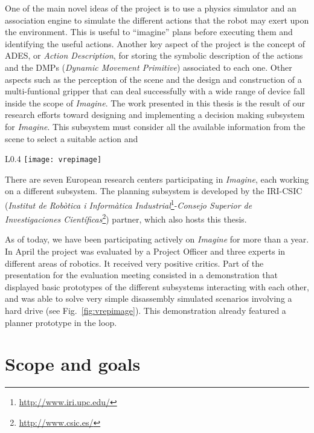\documentclass[../root.tex]{subfiles}
\begin{document}
One of the main novel ideas of the project is to use a physics simulator and an
association engine
to simulate the different actions that the robot may exert upon the environment.
This is useful to ``imagine'' plans before executing them and identifying
the useful actions. Another key aspect of the project is the concept
of ADES, or \emph{Action Description}, for storing the symbolic description
of the actions and the DMPs (\emph{Dynamic Movement Primitive}) associated to
each one. Other aspects such as the perception of the scene and the
design and construction of a multi-funtional gripper that can deal
successfully with a wide range of device fall inside the scope of \emph{Imagine}.
The work presented in this thesis is the result of our research efforts toward
designing and implementing a decision making subsystem for \emph{Imagine}. This
subsystem must consider all the available information from the scene to select
a suitable action and 

\begin{wrapfigure}{L}{0.4\columnwidth}
	\centering
	\texttt{[image: vrepimage]}
	\caption{Execution of a levering action in the V-REP simulator.}
	\label{fig:vrepimage}
\end{wrapfigure}

There are seven European research centers participating in \emph{Imagine},
each working on a different subsystem.
The planning subsystem is developed by the IRI-CSIC 
(\emph{Institut de Rob\`otica i Inform\`atica
Industrial}\footnote{\url{http://www.iri.upc.edu/}}-\emph{Consejo Superior
de Investigaciones
Cient\'ificas}\footnote{\url{http://www.csic.es/}}) partner, which also hosts
this thesis.

As of today, we have been participating actively on \emph{Imagine} for more
than a year.
In April the project was evaluated by a Project Officer and three experts in
different areas of robotics. It received very positive critics. Part of the
presentation for the evaluation meeting consisted in a demonstration that
displayed basic prototypes of the different subsystems interacting with each
other, and was
able to solve very simple disassembly simulated scenarios
involving a
hard drive (see Fig.~\ref{fig:vrepimage}).
This demonstration already featured a planner prototype in the loop.

\section{Scope and goals}
\end{document}
